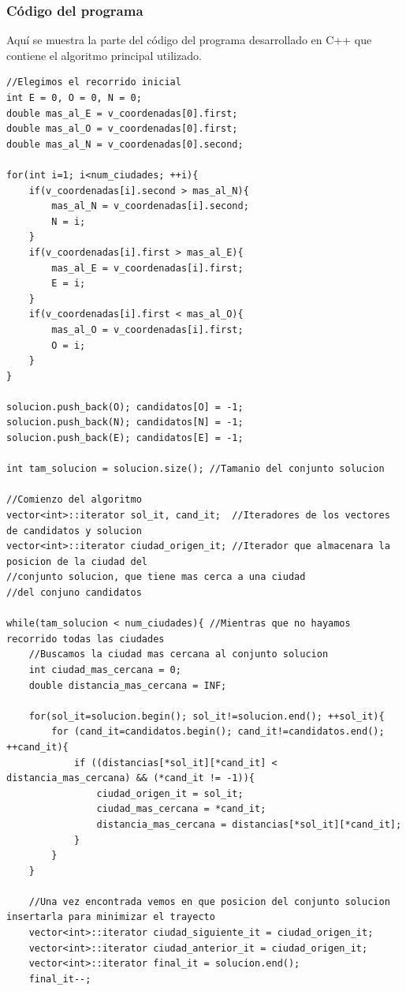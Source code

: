 \documentclass[11pt,a4paper]{article} %
\begin{document}
\subsubsection{Código del programa}
Aquí se muestra la parte del código del programa desarrollado en C++ que contiene el algoritmo principal utilizado.

\begin{lstlisting}[style=C++]
//Elegimos el recorrido inicial
int E = 0, O = 0, N = 0;
double mas_al_E = v_coordenadas[0].first;
double mas_al_O = v_coordenadas[0].first; 
double mas_al_N = v_coordenadas[0].second;

for(int i=1; i<num_ciudades; ++i){
	if(v_coordenadas[i].second > mas_al_N){
		mas_al_N = v_coordenadas[i].second;
		N = i;
	}
	if(v_coordenadas[i].first > mas_al_E){
		mas_al_E = v_coordenadas[i].first;
		E = i;
	}
	if(v_coordenadas[i].first < mas_al_O){
		mas_al_O = v_coordenadas[i].first;
		O = i;
	}
}

solucion.push_back(O); candidatos[O] = -1;
solucion.push_back(N); candidatos[N] = -1;
solucion.push_back(E); candidatos[E] = -1;

int tam_solucion = solucion.size(); //Tamanio del conjunto solucion

//Comienzo del algoritmo
vector<int>::iterator sol_it, cand_it;  //Iteradores de los vectores de candidatos y solucion
vector<int>::iterator ciudad_origen_it; //Iterador que almacenara la posicion de la ciudad del
//conjunto solucion, que tiene mas cerca a una ciudad
//del conjuno candidatos    

while(tam_solucion < num_ciudades){ //Mientras que no hayamos recorrido todas las ciudades
	//Buscamos la ciudad mas cercana al conjunto solucion
	int ciudad_mas_cercana = 0;
	double distancia_mas_cercana = INF;
	
	for(sol_it=solucion.begin(); sol_it!=solucion.end(); ++sol_it){
		for (cand_it=candidatos.begin(); cand_it!=candidatos.end(); ++cand_it){
			if ((distancias[*sol_it][*cand_it] < distancia_mas_cercana) && (*cand_it != -1)){
				ciudad_origen_it = sol_it;
				ciudad_mas_cercana = *cand_it;
				distancia_mas_cercana = distancias[*sol_it][*cand_it];
			}
		}
	}
	
	//Una vez encontrada vemos en que posicion del conjunto solucion insertarla para minimizar el trayecto
	vector<int>::iterator ciudad_siguiente_it = ciudad_origen_it;
	vector<int>::iterator ciudad_anterior_it = ciudad_origen_it;
	vector<int>::iterator final_it = solucion.end();
	final_it--;
	

\end{lstlisting}
\end{document}
